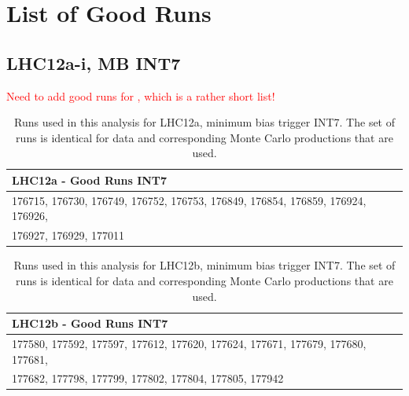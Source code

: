 \section{List of Good Runs}
\label{sec:goodRuns}
\subsection{LHC12a-i, MB INT7}
\label{subsec:goodRuns12}
\textcolor{red}{Need to add good runs for \pPb, which is a rather short list!}

\begin{table}[h!]
	\hspace*{-0.2cm}
	\small
	\centering
	\begin{tabular}{ll}  
	    \toprule
	    \textbf{LHC12a - Good Runs INT7} \\ \midrule
		176715, 176730, 176749, 176752, 176753, 176849, 176854, 176859, 176924, 176926, \\ \midrule
		176927, 176929, 177011 \\
		\bottomrule
	\end{tabular}
	\caption{Runs used in this analysis for LHC12a, minimum bias trigger INT7. The set of runs is identical for data and corresponding Monte Carlo productions that are used.}
	\label{tab:runs12a}
\end{table}
	
\begin{table}[h!]
	\hspace*{-0.2cm}
	\small
	\centering
	\begin{tabular}{ll}  
	    \toprule
	    \textbf{LHC12b - Good Runs INT7} \\ \midrule
		177580, 177592, 177597, 177612, 177620, 177624, 177671, 177679, 177680, 177681, \\ \midrule
		177682, 177798, 177799, 177802, 177804, 177805, 177942 \\
		\bottomrule
	\end{tabular}
	\caption{Runs used in this analysis for LHC12b, minimum bias trigger INT7. The set of runs is identical for data and corresponding Monte Carlo productions that are used.}
	\label{tab:runs12b}
\end{table}
	
